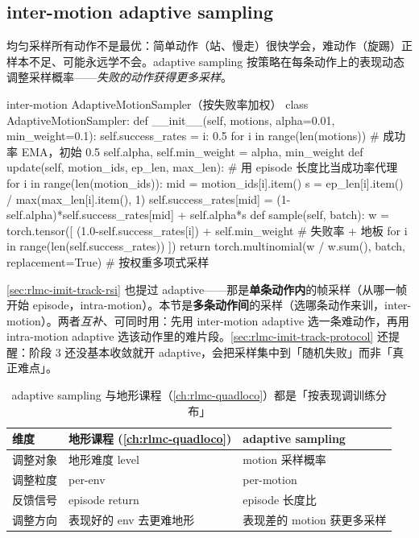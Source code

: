 \subsection{inter-motion adaptive sampling}
\label{sec:rlmc-mi-scale-adaptive}

均匀采样所有动作不是最优：简单动作（站、慢走）很快学会，难动作（旋踢）正样本不足、可能永远学不会。adaptive sampling 按策略在每条动作上的表现动态调整采样概率——\emph{失败的动作获得更多采样}。

\begin{codebox}[Python]{inter-motion AdaptiveMotionSampler（按失败率加权）}
class AdaptiveMotionSampler:
    def __init__(self, motions, alpha=0.01, min_weight=0.1):
        self.success_rates = {i: 0.5 for i in range(len(motions))}  # 成功率 EMA，初始 0.5
        self.alpha, self.min_weight = alpha, min_weight
    def update(self, motion_ids, ep_len, max_len):       # 用 episode 长度比当成功率代理
        for i in range(len(motion_ids)):
            mid = motion_ids[i].item()
            s = ep_len[i].item() / max(max_len[i].item(), 1)
            self.success_rates[mid] = (1-self.alpha)*self.success_rates[mid] + self.alpha*s
    def sample(self, batch):
        w = torch.tensor([ (1.0-self.success_rates[i]) + self.min_weight   # 失败率 + 地板
                           for i in range(len(self.success_rates)) ])
        return torch.multinomial(w / w.sum(), batch, replacement=True)     # 按权重多项式采样
\end{codebox}

\begin{note}
\cref{sec:rlmc-imit-track-rsi} 也提过 adaptive——那是\textbf{单条动作内}的帧采样（从哪一帧开始 episode，intra-motion）。本节是\textbf{多条动作间}的采样（选哪条动作来训，inter-motion）。两者\emph{互补}、可同时用：先用 inter-motion adaptive 选一条难动作，再用 intra-motion adaptive 选该动作里的难片段。\cref{sec:rlmc-imit-track-protocol} 还提醒：阶段 3 还没基本收敛就开 adaptive，会把采样集中到「随机失败」而非「真正难点」。
\end{note}

\begin{table}[ht]
\centering
\small
\caption{adaptive sampling 与地形课程（\cref{ch:rlmc-quadloco}）都是「按表现调训练分布」}
\label{tab:rlmc-mi-curr}
\begin{tabular}{@{}lll@{}}
\toprule
维度 & 地形课程 (\cref{ch:rlmc-quadloco}) & adaptive sampling \\
\midrule
调整对象 & 地形难度 level & motion 采样概率 \\
调整粒度 & per-env & per-motion \\
反馈信号 & episode return & episode 长度比 \\
调整方向 & 表现好的 env 去更难地形 & 表现差的 motion 获更多采样 \\
\bottomrule
\end{tabular}
\end{table}

